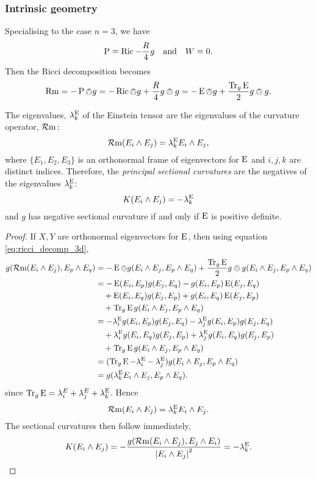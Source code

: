 \documentclass[a4paper, 12pt]{amsart}
\begin{document}
\subsubsection{Intrinsic geometry}
Specialising to the case \(n = 3\), we have
\[
\operatorname{P} = \operatorname{Ric} - \frac{R}{4} g \quad \text{and} \quad W = 0.
\]
Then the Ricci decomposition becomes
\begin{equation}
\label{eq:ricci_decomp_3d}
\operatorname{Rm} = -\operatorname{P} \owedge g = -\operatorname{Ric} \owedge g + \frac{R}{4} g \owedge g = -\operatorname{E} \owedge g + \frac{\operatorname{Tr}_g \operatorname{E}}{2} g \owedge g.
\end{equation}
\begin{lemma}
\label{lem:eins_sectional}
The eigenvalues, \(\lambda^{\operatorname{E}}_k\) of the Einstein tensor are the eigenvalues of the curvature operator, \(\operatorname{\mathcal{R}m}\):
\[
\operatorname{\mathcal{R}m}(E_i \wedge E_j) = \lambda^{\operatorname{E}}_k E_i \wedge E_j
,\]
where \(\{E_1, E_2, E_3\}\) is an orthonormal frame of eigenvectors for \(\operatorname{E}\) and \(i,j,k\) are distinct indices. Therefore, the \emph{principal sectional curvatures} are the negatives of the eigenvalues \(\lambda^{\operatorname{E}}_k\):
\[
K(E_i \wedge E_j) = -\lambda^{\operatorname{E}}_k
\]
and \(g\) has negative sectional curvature if and only if \(\operatorname{E}\) is positive definite.
\end{lemma}
\begin{proof}
If \(X, Y\) are orthonormal eigenvectors for \(\operatorname{E}\), then using equation \eqref{eq:ricci_decomp_3d},
\[
\begin{split}
g(\operatorname{\mathcal{R}m}(E_i \wedge E_j), E_p \wedge E_q) &= -\operatorname{E} \owedge g (E_i \wedge E_j, E_p \wedge E_q) + \frac{\operatorname{Tr}_g \operatorname{E}}{2} g \owedge g (E_i \wedge E_j, E_p \wedge E_q) \\
&= - \operatorname{E}(E_i, E_p) g(E_j, E_q) - g(E_i, E_p) \operatorname{E}(E_j, E_q) \\
&\quad + \operatorname{E}(E_i, E_q) g(E_j, E_p) + g(E_i, E_q) \operatorname{E}(E_j, E_p) \\
&\quad + \operatorname{Tr}_g \operatorname{E} g(E_i \wedge E_j, E_p \wedge E_q) \\
&= - \lambda^{\operatorname{E}}_i g(E_i, E_p) g(E_j, E_q) - \lambda^{\operatorname{E}}_j g(E_i, E_p) g(E_j, E_q) \\
&\quad + \lambda^{\operatorname{E}}_i g(E_i, E_q) g(E_j, E_p) + \lambda^{\operatorname{E}}_j g(E_i, E_q) g(E_j, E_p) \\
&\quad + \operatorname{Tr}_g \operatorname{E} g(E_i \wedge E_j, E_p \wedge E_q) \\
&= (\operatorname{Tr}_g \operatorname{E} - \lambda^{\operatorname{E}}_i - \lambda^{\operatorname{E}}_j) g(E_i \wedge E_j, E_p \wedge E_q) \\
&= g(\lambda^{\operatorname{E}}_k E_i \wedge E_j, E_p \wedge E_q).
\end{split}
\]
since \(\operatorname{Tr}_g \operatorname{E} = \lambda^E_i + \lambda^E_j + \lambda^{\operatorname{E}}_k\). Hence
\[
\operatorname{\mathcal{R}m}(E_i \wedge E_j) = \lambda^{\operatorname{E}}_k E_i \wedge E_j.
\]
The sectional curvatures then follow immediately,
\[
K (E_i \wedge E_j) = -\frac{g(\operatorname{\mathcal{R}m}(E_i \wedge E_j), E_j \wedge E_i)}{\left\lvert{E_i \wedge E_j}\right\rvert^2} = -\lambda^{\operatorname{E}}_k.
\]
\end{proof}
\end{document}
